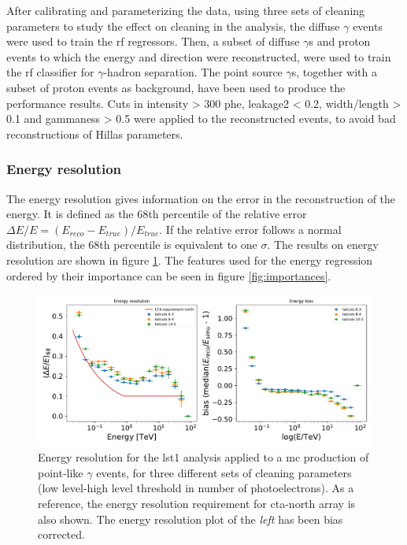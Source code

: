 \documentclass[main.tex]{subfiles}
\begin{document}
After calibrating and parameterizing the data, using three sets of cleaning parameters to study the effect on cleaning in the analysis, the diffuse $\gamma$ events were used to train the \gls{rf} regressors. Then, a subset of diffuse $\gamma$s and proton events to which the energy and direction were reconstructed, were used to train the \gls{rf} classifier for $\gamma$-hadron separation.
The point source $\gamma$s, together with a subset of proton events as background, have been used to produce the performance results. Cuts in intensity > 300 phe, leakage2 < 0.2, width/length > 0.1 and gammaness > 0.5 were applied to the reconstructed events, to avoid bad reconstructions of Hillas parameters.

\subsubsection{Energy resolution}

The energy resolution gives information on the error in the reconstruction of the energy. It is defined as the 68th percentile of the relative error $\Delta E/E = (E_{reco}-E_{true})/E_{true}$. If the relative error follows a normal distribution, the 68th percentile is equivalent to one $\sigma$. The results on energy resolution are shown in figure \ref{fig:energy}. The features used for the energy regression ordered by their importance can be seen in figure \ref{fig:importances}.

\begin{figure}[h]
  \centering
  \includegraphics[width=1\textwidth]{Pictures/energy_resolution.pdf}
  \caption{Energy resolution for the \gls{lst}1 analysis applied to a \gls{mc} production of point-like $\gamma$ events, for three different sets of cleaning parameters (low level-high level threshold in number of photoelectrons). As a reference, the energy resolution requirement for \gls{cta}-north array is also shown. The energy resolution plot of the \textit{left} has been bias corrected.}
  \label{fig:energy}
\end{figure}
\end{document}
